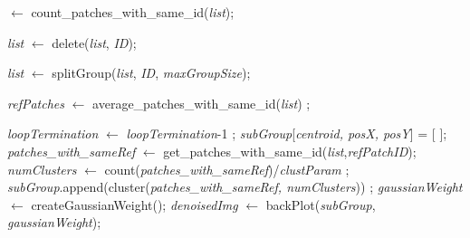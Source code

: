 \documentclass[fleqn,10pt]{wlscirep}
\begin{document}
\begin{algorithm}
\begin{algorithmic}[1]
				 $\gets$ count\_patches\_with\_same\_id(\textit{list});
				
				\State \textit{list} $\gets$ delete(\textit{list}, \textit{ID});
				
				
				\State \textit{list} $\gets$ splitGroup(\textit{list}, \textit{ID}, \textit{maxGroupSize});
				
				
				\EndIf
				
				\EndFor
				
				\State \textit{refPatches} $\gets$ average\_patches\_with\_same\_id(\textit{list}) ;
				
				\State \textit{loopTermination} $\gets$ \textit{loopTermination}-1 ;
				\EndFor
				\State \textit{subGroup}[\textit{centroid, posX, posY}] = [ ];
				\State \textit{patches\_with\_sameRef} $\gets$ get\_patches\_with\_same\_id(\textit{list},\textit{refPatchID});
				\State \textit{numClusters} $\gets$ count(\textit{patches\_with\_sameRef})/\textit{clustParam} ;
				\State \textit{subGroup}.append(cluster(\textit{patches\_with\_sameRef, numClusters})) ;
				\EndFor
				\State \textit{gaussianWeight} $\gets$ createGaussianWeight();
				\State \textit{denoisedImg} $\gets$ backPlot(\textit{subGroup}, \textit{gaussianWeight});
			\end{algorithmic}
		\end{algorithm}
		
		
		
			

		
	
\end{document}
